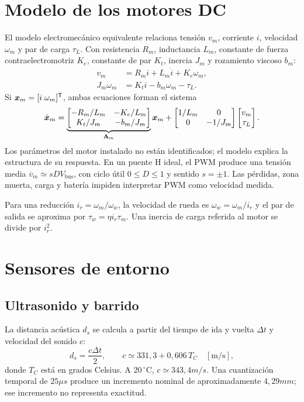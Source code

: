 \section{Modelo de los motores DC}
El modelo electromecánico equivalente relaciona tensión $v_m$, corriente $i$, velocidad $\omega_m$ y par de carga $\tau_L$. Con resistencia $R_m$, inductancia $L_m$, constante de fuerza contraelectromotriz $K_e$, constante de par $K_t$, inercia $J_m$ y rozamiento viscoso $b_m$:
\begin{align}
v_m&=R_mi+L_m\dot i+K_e\omega_m,\label{eq:motor1}\\
J_m\dot\omega_m&=K_ti-b_m\omega_m-\tau_L.\label{eq:motor2}
\end{align}
Si $\boldsymbol{x}_m=[i\;\omega_m]^{\mathsf{T}}$, ambas ecuaciones forman el sistema
\begin{equation}
\dot{\boldsymbol{x}}_m=
\underbrace{\begin{bmatrix}
-R_m/L_m&-K_e/L_m\\
K_t/J_m&-b_m/J_m
\end{bmatrix}}_{\mathbf{A}_m}\boldsymbol{x}_m+
\begin{bmatrix}1/L_m&0\\0&-1/J_m\end{bmatrix}
\begin{bmatrix}v_m\\\tau_L\end{bmatrix}.
\end{equation}
Los parámetros del motor instalado no están identificados; el modelo explica la estructura de su respuesta. En un puente H ideal, el PWM produce una tensión media $\overline v_m\simeq sDV_{\mathrm{bus}}$, con ciclo útil $0\le D\le1$ y sentido $s=\pm1$. Las pérdidas, zona muerta, carga y batería impiden interpretar PWM como velocidad medida.

Para una reducción $i_r=\omega_m/\omega_w$, la velocidad de rueda es $\omega_w=\omega_m/i_r$ y el par de salida se aproxima por $\tau_w=\eta i_r\tau_m$. Una inercia de carga referida al motor se divide por $i_r^2$.

\section{Sensores de entorno}
\subsection{Ultrasonido y barrido}
La distancia acústica $d_s$ se calcula a partir del tiempo de ida y vuelta $\Delta t$ y velocidad del sonido $c$:
\begin{equation}
d_s=\frac{c\Delta t}{2},
\qquad c\simeq331{,}3+0{,}606\,T_C\quad[\mathrm{m/s}],
\end{equation}
donde $T_C$ está en grados Celsius. A $20\,^{\circ}\mathrm C$, $c\simeq343{,}4\unit{m/s}$. Una cuantización temporal de $25\unit{\mu s}$ produce un incremento nominal de aproximadamente $4{,}29\unit{mm}$; ese incremento no representa exactitud.

